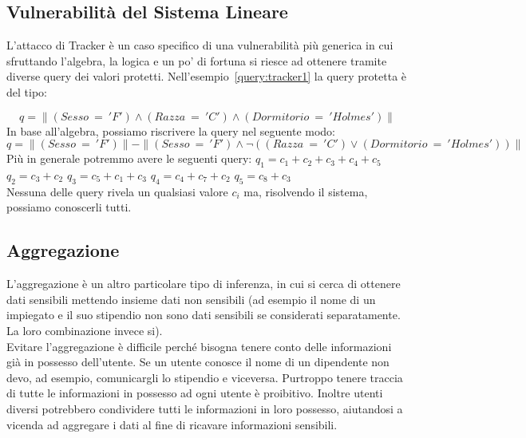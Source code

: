 \subsection{Vulnerabilità del Sistema Lineare}
L'attacco di Tracker è un caso specifico di una vulnerabilità più generica in cui sfruttando l'algebra, la logica e un po' di fortuna si riesce ad ottenere tramite diverse query dei valori protetti. Nell'esempio~\ref{query:tracker1} la query protetta è del tipo:

\begin{equation}
q = \parallel (Sesso \: = \: 'F') \wedge (Razza \: = \: 'C') \wedge (Dormitorio \: = \: 'Holmes') \parallel
\end{equation}
In base all'algebra, possiamo riscrivere la query nel seguente modo: 
{\footnotesize
\begin{equation}
q = \parallel (Sesso \: = \: 'F') \parallel - \parallel (Sesso \: = \: 'F') \wedge \neg( (Razza \: = \: 'C') \vee (Dormitorio \: = \: 'Holmes')) \parallel
\end{equation}}
Più in generale potremmo avere le seguenti query:
\newline
\newline
$q_{1} = c_{1} + c_{2} + c_{3} + c_{4} + c_{5}$
\newline
$q_{2} = c_{3} + c_{2} $
\newline
$q_{3} = c_{5} + c_{1} + c_{3}$
\newline
$q_{4} = c_{4} + c_{7} + c_{2}$
\newline
$q_{5} = c_{8} + c_{3}$
\newline
\\
Nessuna delle query rivela un qualsiasi valore $c_{i}$ ma, risolvendo il sistema, possiamo conoscerli tutti.

\subsection{Aggregazione}
L'aggregazione è un altro particolare tipo di inferenza, in cui si cerca di ottenere dati sensibili mettendo insieme dati non sensibili (ad esempio il nome di un impiegato e il suo stipendio non sono dati sensibili se considerati separatamente. La loro combinazione invece si). \\

Evitare l'aggregazione è difficile perché bisogna tenere conto delle informazioni già in possesso dell'utente. Se un utente conosce il nome di un dipendente non devo, ad esempio, comunicargli lo stipendio e viceversa. Purtroppo tenere traccia di tutte le informazioni in possesso ad ogni utente è proibitivo. Inoltre utenti diversi potrebbero condividere tutti le informazioni in loro possesso, aiutandosi a vicenda ad aggregare i dati al fine di ricavare informazioni sensibili.

